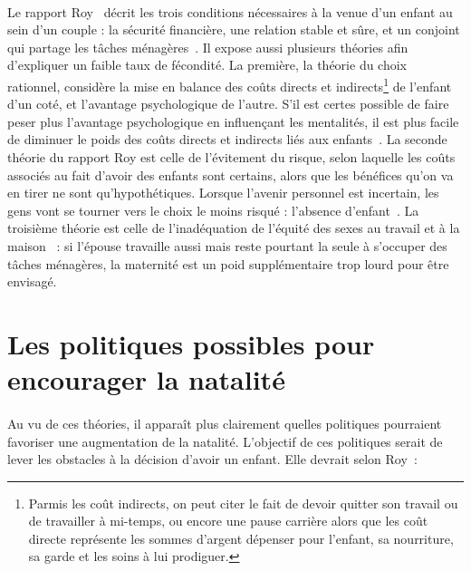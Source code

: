 \paragraph{}Le rapport Roy~\citep{quebec} décrit les trois conditions nécessaires à la venue d’un enfant au sein d’un couple : la sécurité financière, une relation stable et sûre, et un conjoint qui partage les tâches ménagères~\citep[pp.19]{quebec}. Il expose aussi plusieurs théories afin d'expliquer un faible taux de fécondité. La première, la théorie du choix rationnel, considère la mise en balance des coûts directs et indirects\footnote{Parmis les coût indirects, on peut citer le fait de devoir quitter son travail ou de travailler à mi-temps, ou encore une pause carrière alors que les coût directe représente les sommes d'argent dépenser pour l'enfant, sa nourriture, sa garde et les soins à lui prodiguer.} de l’enfant d’un coté, et l’avantage psychologique de l’autre. S'il est certes possible de faire peser plus l’avantage psychologique en influençant les mentalités, il est plus facile de diminuer le poids des coûts directs et indirects liés aux enfants~\citep[pp.23]{quebec}. La seconde théorie du rapport Roy est celle de l’évitement du risque, selon laquelle les coûts associés au fait d’avoir des enfants sont certains, alors que les bénéfices qu’on va en tirer ne sont qu'hypothétiques. Lorsque l'avenir personnel est incertain, les gens vont se tourner vers le choix le moins risqué : l’absence d’enfant~\citep[pp.24]{quebec}. La troisième théorie est celle de l'inadéquation de l’équité des sexes au travail et à la maison~\citep[pp.25]{quebec} : si l'épouse travaille aussi mais reste pourtant la seule à s'occuper des tâches ménagères, la maternité est un poid supplémentaire trop lourd pour être envisagé.

\section{Les politiques possibles pour encourager la natalité}
\paragraph{}Au vu de ces théories, il apparaît plus clairement quelles politiques pourraient favoriser une augmentation de la natalité. L’objectif de ces politiques serait de lever les obstacles à la décision d’avoir un enfant. Elle devrait selon Roy~\citep[pp.43-46]{quebec}:

